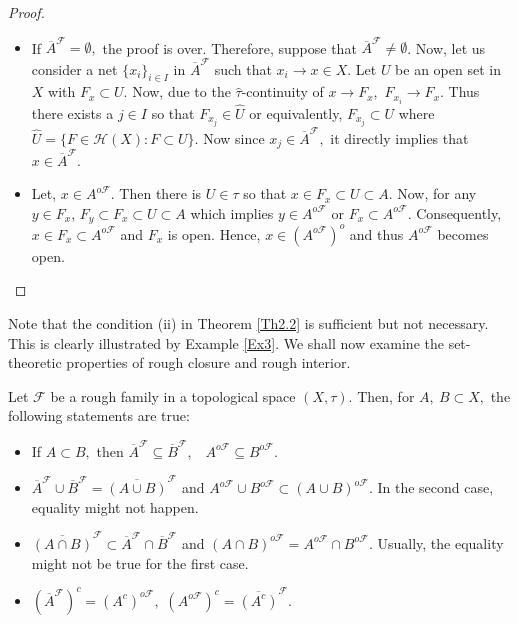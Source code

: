 \documentclass[11pt]{amsart}
\begin{document}
\begin{proof} 
\begin{itemize}
    \item[(i)] If $\overline{A}^\mathscr{F}=\emptyset,$ the proof is over. Therefore, suppose that $\overline{A}^\mathscr{F}\neq\emptyset$. Now, let us consider a net $\{x_i\}_{i\in I}$ in $\overline{A}^\mathscr{F}$ such that $x_i\to x\in X.$ Let $U$ be an open set in $X$ with $F_x\subset U.$ Now, due to the $\hat{\tau}$-continuity of $x\to F_x,$ $F_{x_i}\to F_x.$ Thus there exists a $j\in I$ so that $F_{x_j}\in \hat{U}$ or equivalently, $F_{x_j}\subset U$ where $\hat{U}=\{F\in \mathcal{H}(X): F\subset U\}.$  Now since $x_j\in \overline{A}^\mathscr{F},$ it directly implies that $x\in \overline{A}^\mathscr{F}.$ 
    
    \item[(ii)] Let, $x\in A^{o\mathscr{F}}.$ Then there is $U\in \tau$ so that $x\in F_x\subset U\subset A$. Now, for any $y\in F_x$, $F_y\subset F_x\subset U\subset A$ which implies $y\in A^{o\mathscr{F}}$ or $F_x\subset A^{o\mathscr{F}}$. Consequently, $x\in F_x\subset A^{o\mathscr{F}}$ and $F_x$ is open. Hence, $x\in (A^{o\mathscr{F}})^o$ and thus $A^{o\mathscr{F}}$ becomes open.
\end{itemize}
\end{proof}

Note that the condition (ii) in Theorem \ref{Th2.2} is sufficient but not necessary. This is clearly illustrated by Example \ref{Ex3}. We shall now examine the set-theoretic properties of rough closure and rough interior.

\begin{theorem}
    Let $\mathscr{F}$ be a rough family in a topological space $(X,\tau)$. Then, for $A, ~B\subset X,$ the following statements are true:
    \begin{itemize}
        \item[(i)] If $A\subset B,$ then $\overline{A}^\mathscr{F}\subseteq \overline{B}^\mathscr{F},$ ~$A^{o\mathscr{F}}\subseteq B^{o\mathscr{F}}.$
        
        \item[(ii)] $\overline{A}^\mathscr{F}\cup\overline{B}^\mathscr{F}= \overline{(A\cup B)}^\mathscr{F}$ and $A^{o\mathscr{F}}\cup B^{o\mathscr{F}}\subset (A\cup B)^{o\mathscr{F}}.$ In the second case, equality might not happen.
        
        \item[(iii)] $\overline{(A\cap B)}^\mathscr{F}\subset \overline{A}^\mathscr{F}\cap\overline{B}^\mathscr{F}$ and $(A\cap B)^{o\mathscr{F}}=A^{o\mathscr{F}}\cap B^{o\mathscr{F}}.$ Usually, the equality might not be true for the first case.
        
        \item[(iv)] $\left(\overline{A}^\mathscr{F}\right)^c=(A^c)^{o\mathscr{F}},$ $\left(A^{o\mathscr{F}}\right)^c=\overline{(A^c)}^\mathscr{F}.$
    \end{itemize}
\end{theorem}
\end{document}
